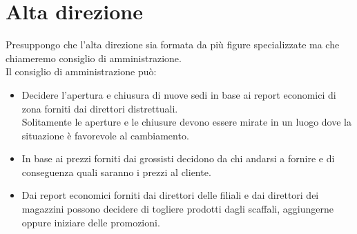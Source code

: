 \documentclass{report}
\begin{document}
   \chapter*{Alta direzione}
   Presuppongo che l'alta direzione sia formata da più figure specializzate ma che chiameremo consiglio di amministrazione.\\
   Il consiglio di amministrazione può:
   \begin{itemize}
        \item Decidere l'apertura e chiusura di nuove sedi in base ai report economici di zona forniti dai direttori distrettuali.\\
            Solitamente le aperture e le chiusure devono essere mirate in un luogo dove la situazione è favorevole al cambiamento.
        \item In base ai prezzi forniti dai grossisti decidono da chi andarsi a fornire e di conseguenza quali saranno i prezzi al cliente.
        \item Dai report economici forniti dai direttori delle filiali e dai direttori dei magazzini possono decidere di togliere prodotti dagli scaffali, aggiungerne oppure iniziare delle promozioni.
   \end{itemize}
\end{document}
